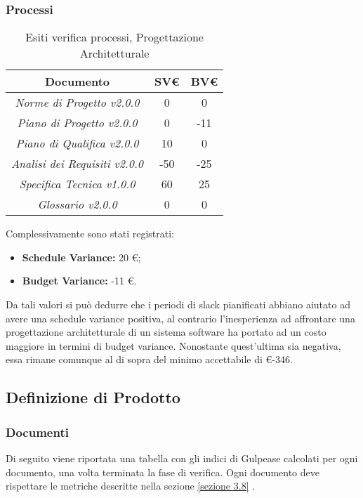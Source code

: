 \subsubsection{Processi}
\label{appendice 4}
\vspace{3mm}

\begin{table}[h]
	\begin{tabular}{|c|c|c|}
		\toprule
			\textbf{Documento} & \textbf{SV\euro} & \textbf{BV\euro} \\ 
		\midrule
		\midrule
			\textit{Norme di Progetto v2.0.0} & 0 & 0 \\  
			\textit{Piano di Progetto v2.0.0} & 0 & -11 \\ 
			\textit{Piano di Qualifica v2.0.0} & 10 & 0 \\ 
			\textit{Analisi dei Requisiti v2.0.0} & -50 & -25 \\
			\textit{Specifica Tecnica v1.0.0} & 60 & 25 \\ 
			\textit{Glossario v2.0.0} & 0 & 0 \\ 
		\bottomrule
	\end{tabular}
\caption{Esiti verifica processi, Progettazione Architetturale}
\end{table}

\noindent Complessivamente sono stati registrati:
\begin{itemize}
	\item \textbf{Schedule Variance:} 20 \euro;
	\item \textbf{Budget Variance:} -11 \euro.
\end{itemize}

\noindent Da tali valori si può dedurre che i periodi di slack pianificati abbiano aiutato ad avere una schedule variance positiva, al contrario l'inesperienza ad affrontare una progettazione architetturale di un sistema software ha portato ad un costo maggiore in termini di budget variance. Nonostante quest'ultima sia negativa, essa rimane comunque al di sopra del minimo accettabile di \euro -346.


\subsection{Definizione di Prodotto}
\subsubsection{Documenti}
\label{appendice 5}

Di seguito viene riportata una tabella con gli indici di Gulpease calcolati per ogni documento, una volta terminata la fase di verifica. Ogni documento deve rispettare le metriche descritte nella sezione \ref{sezione 3.8} .\\

